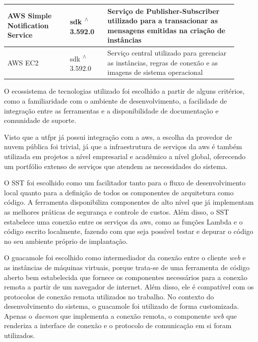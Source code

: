 \begin{longtable}{p{0.25\linewidth} p{0.15\linewidth} p{0.525\linewidth}}
\hline

AWS Simple Notification Service \citep{awssnsdocs} & \gls{sdk} \textsuperscript{$\wedge$}3.592.0 & Serviço de Publisher-Subscriber utilizado para a transacionar as mensagens emitidas na criação de instâncias \\

\hline

AWS EC2 \citep{awsec2docs} & \gls{sdk} \textsuperscript{$\wedge$}3.592.0 & Serviço central utilizado para gerenciar as instâncias, regras de conexão e as imagens de sistema operacional \\

\hline

\end{longtable}

O ecossistema de tecnologias utilizado foi escolhido a partir de alguns critérios, como a familiaridade com o ambiente de desenvolvimento, a facilidade de integração entre as ferramentas e a disponibilidade de documentação e comunidade de suporte.

Visto que a \gls{utfpr} já possui integração com a \gls{aws}, a escolha da provedor de nuvem pública foi trivial, já que a infraestrutura de serviços da \gls{aws} é também utilizada em projetos a nível empresarial e acadêmico a nível global, oferecendo um portfólio extenso de serviços que atendem as necessidades do sistema.

O SST foi escolhido como um facilitador tanto para o fluxo de desenvolvimento local quanto para a definição de todos os componentes de arquitetura como código. A ferramenta disponibiliza componentes de alto nível que já implementam as melhores práticas de segurança e controle de custos. Além disso, o SST estabelece uma conexão entre os serviços da \gls{aws}, como as funções Lambda e o código escrito localmente, fazendo com que seja possível testar e depurar o código no seu ambiente próprio de implantação.

O \gls{guacamole} foi escolhido como intermediador da conexão entre o cliente \textit{web} e as instâncias de máquinas virtuais, porque trata-se de uma ferramenta de código aberto bem estabelecida que fornece os componentes necessários para a conexão remota a partir de um navegador de internet. Além disso, ele é compatível com os protocolos de conexão remota utilizados no trabalho. No contexto do desenvolvimento do sistema, o \gls{guacamole} foi utilizado de forma customizada. Apenas o \textit{daemon} que implementa a conexão remota, o componente \textit{web} que renderiza a interface de conexão e o protocolo de comunicação em si foram utilizados.

